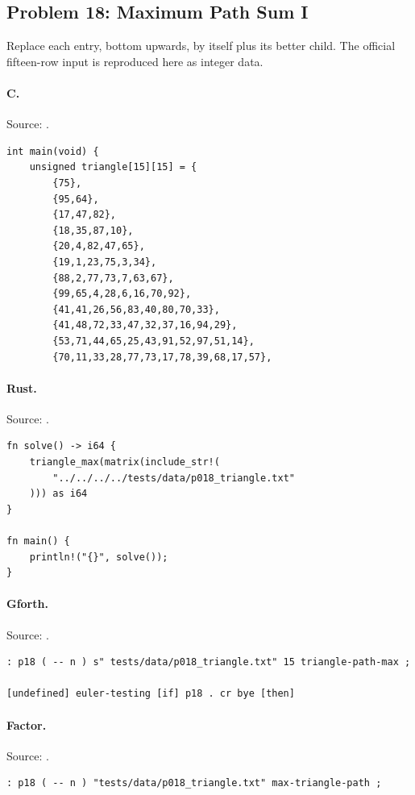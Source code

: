 \subsection{Problem 18: Maximum Path Sum I}
\label{walkthrough:p18}
Replace each entry, bottom upwards, by itself plus its better child. The official fifteen-row input is reproduced here as integer data.

\paragraph{C.} Source: .
\begin{lstlisting}
int main(void) {
    unsigned triangle[15][15] = {
        {75},
        {95,64},
        {17,47,82},
        {18,35,87,10},
        {20,4,82,47,65},
        {19,1,23,75,3,34},
        {88,2,77,73,7,63,67},
        {99,65,4,28,6,16,70,92},
        {41,41,26,56,83,40,80,70,33},
        {41,48,72,33,47,32,37,16,94,29},
        {53,71,44,65,25,43,91,52,97,51,14},
        {70,11,33,28,77,73,17,78,39,68,17,57},
\end{lstlisting}

\paragraph{Rust.} Source: .
\begin{lstlisting}
fn solve() -> i64 {
    triangle_max(matrix(include_str!(
        "../../../../tests/data/p018_triangle.txt"
    ))) as i64
}

fn main() {
    println!("{}", solve());
}
\end{lstlisting}

\paragraph{Gforth.} Source: .
\begin{lstlisting}
: p18 ( -- n ) s" tests/data/p018_triangle.txt" 15 triangle-path-max ;

[undefined] euler-testing [if] p18 . cr bye [then]
\end{lstlisting}

\paragraph{Factor.} Source: .
\begin{lstlisting}
: p18 ( -- n ) "tests/data/p018_triangle.txt" max-triangle-path ;
\end{lstlisting}

